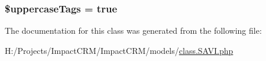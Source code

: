 \label{classSAVI__Parser_a0a6ff866cad56154d31e649d69ac8c0f}
\hypertarget{classSAVI__Parser_ab025198049ed7f6ff96c43aba8c4ad20}{
\subsubsection[{\$uppercaseTags}]{\setlength{\rightskip}{0pt plus 5cm}\$uppercaseTags = true}}
\label{classSAVI__Parser_ab025198049ed7f6ff96c43aba8c4ad20}


The documentation for this class was generated from the following file:\begin{DoxyCompactItemize}
\item 
H:/Projects/ImpactCRM/ImpactCRM/models/\hyperlink{class_8SAVI_8php}{class.SAVI.php}\end{DoxyCompactItemize}
